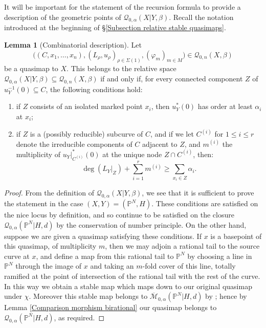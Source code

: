 \documentclass[10pt]{amsart}
\newcommand{\M}[4]{\overline{\mathcal{M}}_{#1,#2}(#3,#4)}
\newcommand{\Q}[4]{\mathcal{Q}_{#1,#2}(#3,#4)}
\newcommand{\PP}{\mathbb P}
\theoremstyle{definition}
\newtheorem{lem}[thm]{Lemma}
\theoremstyle{definition}
\begin{document}
It will be important for the statement of the recursion formula to provide a description of the geometric points of $\Q{0}{\alpha}{X|Y}{\beta}$. Recall the notation introduced at the beginning of \S \ref{Subsection relative stable quasimaps}.
\begin{lem}[Combinatorial description] Let
\begin{equation*} \big((C,x_1,\ldots,x_n), (L_\rho,u_\rho)_{\rho \in \Sigma(1)}, (\varphi_m)_{m \in M}\big) \in \Q{0}{n}{X}{\beta}\end{equation*}
be a quasimap to $X$. This belongs to the relative space $\Q{0}{\alpha}{X|Y}{\beta}\subseteq \Q{0}{n}{X}{\beta}$ if and only if, for every connected component $Z$ of $u_Y^{-1}(0) \subseteq C$, the following conditions hold:
\begin{enumerate}
\item if $Z$ consists of an isolated marked point $x_i$, then $u_Y^*(0)$ has order at least $\alpha_i$ at $x_i$;
\item if $Z$ is a (possibly reducible) subcurve of $C$, and if we let $C^{(i)}$ for $1 \leq i \leq r$ denote the irreducible components of $C$ adjacent to $Z$, and $m^{(i)}$ the multiplicity of $u_Y|_{C^{(i)}}^*(0)$ at the unique node $Z \cap C^{(i)}$, then:
\begin{equation} \label{Relative quasimap internal component inequality} \deg(L_{Y}|_Z) + \sum_{i=1}^r m^{(i)} \geq \sum_{x_i \in Z} \alpha_i. \end{equation}
\end{enumerate}
\end{lem}
\begin{proof}
From the definition of $\Q{0}{\alpha}{X|Y}{\beta}$, we see that it is sufficient to prove the statement in the case $(X,Y)=(\PP^N,H)$. These conditions are satisfied on the nice locus by definition, and so continue to be satisfied on the closure $\Q{0}{\alpha}{\PP^N|H}{d}$ by the conservation of number principle. On the other hand, suppose we are given a quasimap satisfying these conditions. If $x$ is a basepoint of this quasimap, of multiplicity $m$, then we may adjoin a rational tail to the source curve at $x$, and define a map from this rational tail to $\PP^N$ by choosing a line in $\PP^N$ through the image of $x$ and taking an $m$-fold cover of this line, totally ramified at the point of intersection of the rational tail with the rest of the curve. In this way we obtain a stable map which maps down to our original quasimap under $\chi$. Moreover this stable map belongs to $\M{0}{\alpha}{\PP^N|H}{d}$ by \cite[Proposition 1.14]{Ga}; hence by Lemma \ref{Comparison morphism birational} our quasimap belongs to $\Q{0}{\alpha}{\PP^N|H}{d}$, as required.
\end{proof}
\end{document}
